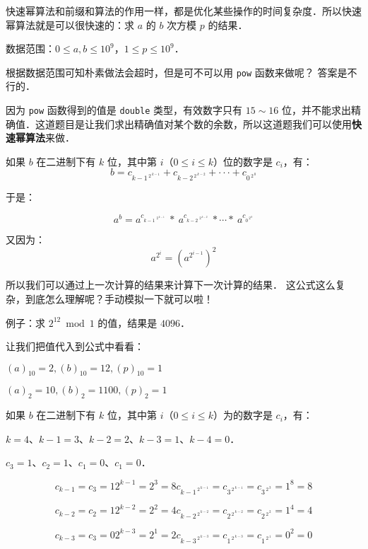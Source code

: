 
快速幂算法和前缀和算法的作用一样，都是优化某些操作的时间复杂度．所以快速幂算法就是可以很快速的：求 $a$ 的 $b$ 次方模 $p$ 的结果．

数据范围：$0 \le a,b \le 10^9$，$1 \le p \le 10^9$．

根据数据范围可知朴素做法会超时，但是可不可以用 \verb|pow| 函数来做呢？
答案是不行的．

因为 \verb|pow| 函数得到的值是 \verb|double| 类型，有效数字只有 $15\sim16$ 位，并不能求出精确值．这道题目是让我们求出精确值对某个数的余数，所以这道题我们可以使用\textbf{快速幂算法}来做．

如果 $b$ 在二进制下有 $k$ 位，其中第 $i$（$0 \le i \le k$）位的数字是 $c_i$，有：
\begin{equation}
b = c_{{k-1}^{\ 2^{\ k-1}}}+c_{{k-2}^{\ 2^{\ k-2}}}+\cdot\cdot\cdot+c_{{0}^{\ 2^{\ 0}}}
\end{equation}

于是：

\begin{equation}
a^b= a^{c_{{k-1}^{\ \ 2^{\ k-1}}}} \ *\  a^{c_{{k-2}^{\ \ 2^{\ k-2}}}} \ * \cdots * \ a^{c_{{0}^{\ 2^{\ 0}}}}
\end{equation}

又因为：
$$
a^{2^{i}} = (a^{2^{i-1}})^2
$$

所以我们可以通过上一次计算的结果来计算下一次计算的结果．
这公式这么复杂，到底怎么理解呢？手动模拟一下就可以啦！

例子：求 $2^{12} \bmod 1$ 的值，结果是 $4096$．

让我们把值代入到公式中看看：

$ (a) _ {10} =  2, (b) _ {10} = 12, (p) _ {10} = 1$

$ (a) _ 2 = 10, (b) _ 2 = 1100, (p) _ 2 = 1 $

如果 $b$ 在二进制下有 $k$ 位，其中第 $i$（$0 \le i \le k$）为的数字是 $c_i$，有：

$k = 4$、$k - 1 = 3$、$k - 2 = 2$、$k - 3 = 1$、$k - 4 = 0$．

$c_3 = 1$、$c_2 = 1$、$c_1 = 0$、$c_1 = 0$．

$$
c_{k - 1} = c_3 = 1
2 ^ {k - 1} = 2 ^ 3 = 8
c_{{k-1}^{\ 2^{\ k-1}}} = c_{{3}^{\ 2^{\ k-1}}} = c_{{3}^{\ 2^{\ 3}}} = 1^8 = 8
$$

$$
c_{k - 2} = c_2 = 1
2 ^ {k - 2} = 2 ^ 2 = 4
c_{{k-2}^{\ 2^{\ k-2}}} = c_{{2}^{\ 2^{\ k-2}}} = c_{{2}^{\ 2^{\ 2}}} = 1^4 = 4
$$

$$
c_{k - 3} = c_3 = 0
2 ^ {k - 3} = 2 ^ 1 = 2
c_{{k-3}^{\ 2^{\ k-3}}} = c_{{1}^{\ 2^{\ k-3}}} = c_{{1}^{\ 2^{\ 1}}} = 0^2 = 0
$$

